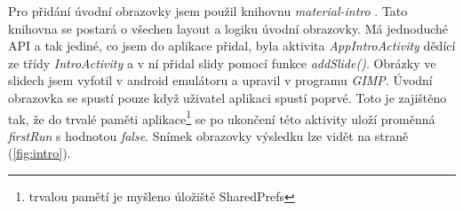 \documentclass[../TakeYourPill.tex]{subfiles}
\begin{document}
Pro přidání úvodní obrazovky jsem použil knihovnu \textit{material-intro} \cite{intro}. Tato knihovna se postará o všechen layout a logiku úvodní obrazovky. Má jednoduché API a tak jediné, co jsem do aplikace přidal, byla aktivita \textit{AppIntroActivity} dědící ze třídy \textit{IntroActivity} a v ní přidal slidy pomocí funkce \textit{addSlide()}. Obrázky ve slidech jsem vyfotil v android emulátoru a upravil v programu \textit{GIMP}. Úvodní obrazovka se spustí pouze když uživatel aplikaci spustí poprvé. Toto je zajištěno tak, že do trvalé paměti aplikace\footnote{trvalou pamětí je myšleno úložiště SharedPrefs} se po ukončení této aktivity uloží proměnná \textit{firstRun} s hodnotou \textit{false}. Snímek obrazovky výsledku lze vidět na straně \pageref{fig:intro} (\ref{fig:intro}).
\end{document}
